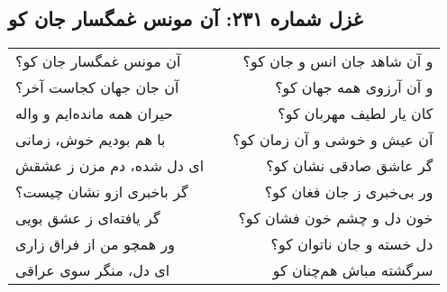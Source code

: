 \begin{center}
\section*{غزل شماره ۲۳۱: آن مونس غمگسار جان کو}
\label{sec:231}
\begin{longtable}{l p{0.5cm} r}
آن مونس غمگسار جان کو؟
&&
و آن شاهد جان انس و جان کو؟
\\
آن جان جهان کجاست آخر؟
&&
و آن آرزوی همه جهان کو؟
\\
حیران همه مانده‌ایم و واله
&&
کان یار لطیف مهربان کو؟
\\
با هم بودیم خوش، زمانی
&&
آن عیش و خوشی و آن زمان کو؟
\\
ای دل شده، دم مزن ز عشقش
&&
گر عاشق صادقی نشان کو؟
\\
گر باخبری ازو نشان چیست؟
&&
ور بی‌خبری ز جان فغان کو؟
\\
گر یافته‌ای ز عشق بویی
&&
خون دل و چشم خون فشان کو؟
\\
ور همچو من از فراق زاری
&&
دل خسته و جان ناتوان کو؟
\\
ای دل، منگر سوی عراقی
&&
سرگشته مباش هم‌چنان کو
\\
\end{longtable}
\end{center}
